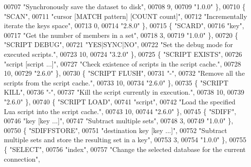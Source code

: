 \begin{DoxyCode}
00707     \textcolor{stringliteral}{"Synchronously save the dataset to disk"},
00708     9,
00709     \textcolor{stringliteral}{"1.0.0"} \},
00710     \{ \textcolor{stringliteral}{"SCAN"},
00711     \textcolor{stringliteral}{"cursor [MATCH pattern] [COUNT count]"},
00712     \textcolor{stringliteral}{"Incrementally iterate the keys space"},
00713     0,
00714     \textcolor{stringliteral}{"2.8.0"} \},
00715     \{ \textcolor{stringliteral}{"SCARD"},
00716     \textcolor{stringliteral}{"key"},
00717     \textcolor{stringliteral}{"Get the number of members in a set"},
00718     3,
00719     \textcolor{stringliteral}{"1.0.0"} \},
00720     \{ \textcolor{stringliteral}{"SCRIPT DEBUG"},
00721     \textcolor{stringliteral}{"YES|SYNC|NO"},
00722     \textcolor{stringliteral}{"Set the debug mode for executed scripts."},
00723     10,
00724     \textcolor{stringliteral}{"3.2.0"} \},
00725     \{ \textcolor{stringliteral}{"SCRIPT EXISTS"},
00726     \textcolor{stringliteral}{"script [script ...]"},
00727     \textcolor{stringliteral}{"Check existence of scripts in the script cache."},
00728     10,
00729     \textcolor{stringliteral}{"2.6.0"} \},
00730     \{ \textcolor{stringliteral}{"SCRIPT FLUSH"},
00731     \textcolor{stringliteral}{"-"},
00732     \textcolor{stringliteral}{"Remove all the scripts from the script cache."},
00733     10,
00734     \textcolor{stringliteral}{"2.6.0"} \},
00735     \{ \textcolor{stringliteral}{"SCRIPT KILL"},
00736     \textcolor{stringliteral}{"-"},
00737     \textcolor{stringliteral}{"Kill the script currently in execution."},
00738     10,
00739     \textcolor{stringliteral}{"2.6.0"} \},
00740     \{ \textcolor{stringliteral}{"SCRIPT LOAD"},
00741     \textcolor{stringliteral}{"script"},
00742     \textcolor{stringliteral}{"Load the specified Lua script into the script cache."},
00743     10,
00744     \textcolor{stringliteral}{"2.6.0"} \},
00745     \{ \textcolor{stringliteral}{"SDIFF"},
00746     \textcolor{stringliteral}{"key [key ...]"},
00747     \textcolor{stringliteral}{"Subtract multiple sets"},
00748     3,
00749     \textcolor{stringliteral}{"1.0.0"} \},
00750     \{ \textcolor{stringliteral}{"SDIFFSTORE"},
00751     \textcolor{stringliteral}{"destination key [key ...]"},
00752     \textcolor{stringliteral}{"Subtract multiple sets and store the resulting set in a key"},
00753     3,
00754     \textcolor{stringliteral}{"1.0.0"} \},
00755     \{ \textcolor{stringliteral}{"SELECT"},
00756     \textcolor{stringliteral}{"index"},
00757     \textcolor{stringliteral}{"Change the selected database for the current connection"},

\end{DoxyCode}
